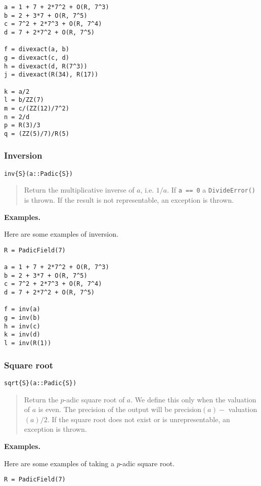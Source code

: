 \documentclass[a4paper,10pt]{article}
\newcommand{\code}{\lstinline}
\newcommand{\desc}[1]{\vspace{-3mm}\begin{quote}#1\end{quote}}
\begin{document}
{{{\begin{lstlisting}
a = 1 + 7 + 2*7^2 + O(R, 7^3)
b = 2 + 3*7 + O(R, 7^5)
c = 7^2 + 2*7^3 + O(R, 7^4)
d = 7 + 2*7^2 + O(R, 7^5)

f = divexact(a, b)
g = divexact(c, d)
h = divexact(d, R(7^3))
j = divexact(R(34), R(17))

k = a/2
l = b/ZZ(7)
m = c/(ZZ(12)/7^2)
n = 2/d
p = R(3)/3
q = (ZZ(5)/7)/R(5)
\end{lstlisting}

\subsubsection{Inversion}

\begin{lstlisting}
inv{S}(a::Padic{S})
\end{lstlisting}

\desc{Return the multiplicative inverse of $a$, i.e. $1/a$. If \code{a == 0}
a \code{DivideError()} is thrown. If the result is not representable, an
exception is thrown.}

\textbf{Examples.}

Here are some examples of inversion.

\begin{lstlisting}
R = PadicField(7)

a = 1 + 7 + 2*7^2 + O(R, 7^3)
b = 2 + 3*7 + O(R, 7^5)
c = 7^2 + 2*7^3 + O(R, 7^4)
d = 7 + 2*7^2 + O(R, 7^5)

f = inv(a)
g = inv(b)
h = inv(c)
k = inv(d)
l = inv(R(1))
\end{lstlisting}

\subsubsection{Square root}

\begin{lstlisting}
sqrt{S}(a::Padic{S})
\end{lstlisting}

\desc{Return the $p$-adic square root of $a$. We define this only when the
valuation of $a$ is even. The precision of the output will be precision$(a) -$
valuation$(a)/2$. If the square root does not exist or is unrepresentable, an
exception is thrown.}

\textbf{Examples.}

Here are some examples of taking a $p$-adic square root.

\begin{lstlisting}
R = PadicField(7)


\end{lstlisting}}}}
\end{document}
